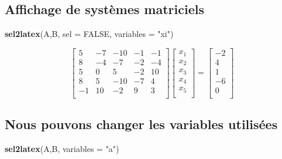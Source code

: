 \documentclass[]{article}
\newenvironment{Shaded}{\begin{snugshade}}{\end{snugshade}}
\newcommand{\DataTypeTok}[1]{\textcolor[rgb]{0.13,0.29,0.53}{#1}}
\newcommand{\KeywordTok}[1]{\textcolor[rgb]{0.13,0.29,0.53}{\textbf{#1}}}
\newcommand{\NormalTok}[1]{#1}
\newcommand{\OtherTok}[1]{\textcolor[rgb]{0.56,0.35,0.01}{#1}}
\newcommand{\StringTok}[1]{\textcolor[rgb]{0.31,0.60,0.02}{#1}}
\begin{document}
\hypertarget{affichage-de-systemes-matriciels}{%
\subsection{Affichage de systèmes
matriciels}\label{affichage-de-systemes-matriciels}}

\begin{Shaded}
\begin{Highlighting}[]
\KeywordTok{sel2latex}\NormalTok{(A,B, }\DataTypeTok{sel =} \OtherTok{FALSE}\NormalTok{, }\DataTypeTok{variables =} \StringTok{"xi"}\NormalTok{)}
\end{Highlighting}
\end{Shaded}

\[
\left[
\begin{array}{rrrrr}
5 & -7 & -10 & -1 & -1 \\ 
8 & -4 & -7 & -2 & -4 \\ 
5 & 0 & 5 & -2 & 10 \\ 
8 & 5 & -10 & -7 & 4 \\ 
-1 & 10 & -2 & 9 & 3 \\ 
\end{array}
\right]\left[
\begin{array}{c} 
x_{1} \\ 
x_{2} \\ 
x_{3} \\ 
x_{4} \\ 
x_{5} \\
\end{array}
\right]=\left[
\begin{array}{r}
-2 \\ 
4 \\ 
1 \\ 
-6 \\ 
0 \\ 
\end{array}
\right]
\]

\hypertarget{nous-pouvons-changer-les-variables-utilisees}{%
\subsection{Nous pouvons changer les variables
utilisées}\label{nous-pouvons-changer-les-variables-utilisees}}

\begin{Shaded}
\begin{Highlighting}[]
\KeywordTok{sel2latex}\NormalTok{(A,B, }\DataTypeTok{variables =} \StringTok{"a"}\NormalTok{)}
\end{Highlighting}
\end{Shaded}
\end{document}
